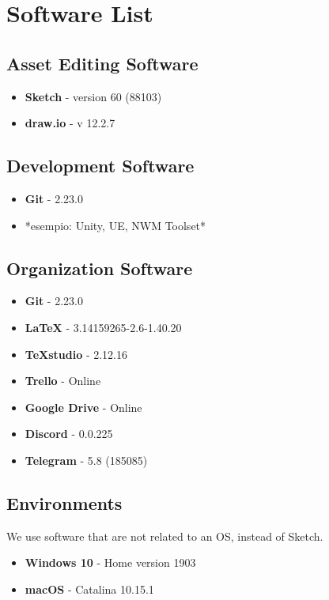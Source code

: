 \section{Software List}

\subsection{Asset Editing Software}

\begin{itemize}
	\item \textbf{Sketch} - version 60 (88103)
	\item \textbf{draw.io} - v 12.2.7
\end{itemize}


\subsection{Development Software}

\begin{itemize}
	\item \textbf{Git} - 2.23.0
	\item *esempio: Unity, UE, NWM Toolset*
\end{itemize}

\subsection{Organization Software}

\begin{itemize}
	\item \textbf{Git} - 2.23.0
	\item \textbf{LaTeX} - 3.14159265-2.6-1.40.20
	\item \textbf{TeXstudio} - 2.12.16
	\item \textbf{Trello} - Online
	\item \textbf{Google Drive} - Online
	\item \textbf{Discord} - 0.0.225
	\item \textbf{Telegram} - 5.8 (185085)
\end{itemize}

\subsection{Environments}
We use software that are not related to an OS, instead of Sketch.

\begin{itemize}
	\item \textbf{Windows 10} - Home version 1903
	\item \textbf{macOS} - Catalina 10.15.1
\end{itemize}
